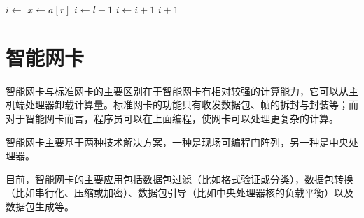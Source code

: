 \makeatletter
\newenvironment{breakablealgorithm2}
  {%
   \begin{center}
     \refstepcounter{algorithm}%
     \hrule height.8pt depth0pt \kern2pt%
     \renewcommand{\caption}[2][\relax]{%
       {\raggedright\textbf{\ALG@name~\thealgorithm} ##2\par}%
       \ifx\relax##1\relax %
         \addcontentsline{loa}{algorithm}{\protect\numberline{\thealgorithm}##2}%
       \else %
         \addcontentsline{loa}{algorithm}{\protect\numberline{\thealgorithm}##1}%
       \fi
       \kern2pt\hrule\kern2pt
     }
  }{%
     \kern2pt\hrule\relax%
   \end{center}
  }
\makeatother
\begin{breakablealgorithm}
\begin{algorithmic}[1]
\State $i \gets$ 
\State {}
\State $x \gets a[r]$
\State $i \gets l - 1$
\State $i \gets i + 1$
\State {}
\EndIf
\EndFor
\State {}
\State \Return $i + 1$
\EndProcedure
\end{algorithmic}
\end{breakablealgorithm}

\section{智能网卡}
智能网卡与标准网卡的主要区别在于智能网卡有相对较强的计算能力，它可以从主机端处理器卸载计算量。标准网卡的功能只有收发数据包、帧的拆封与封装等；而对于智能网卡而言，程序员可以在上面编程，使网卡可以处理更复杂的计算。

智能网卡主要基于两种技术解决方案，一种是现场可编程门阵列，另一种是中央处理器。

目前，智能网卡的主要应用包括数据包过滤（比如格式验证或分类），数据包转换（比如串行化、压缩或加密）、数据包引导（比如中央处理器核的负载平衡）以及数据包生成等。